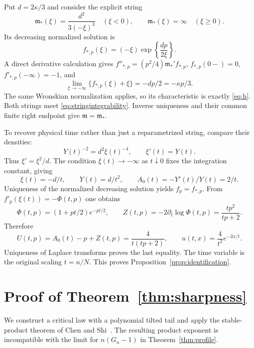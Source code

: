 \documentclass[11pt,letterpaper,reqno]{amsart}
\theoremstyle{plain}
\begin{document}
Put $d=2\kappa/3$ and consider the explicit string
\begin{equation}\label{eq:modelstring}
 \mathfrak m_*(\xi)=\frac{d^2}{3(-\xi)^3}\quad(\xi<0),\qquad
 \mathfrak m_*(\xi)=\infty\quad(\xi\ge0).
\end{equation}
Its decreasing normalized solution is
\[
 f_{*,p}(\xi)=(-\xi)\exp\left\{\frac{dp}{2\xi}\right\}.
\]
A direct derivative calculation gives $f''_{*,p}=(p^2/4)\mathfrak m_*'f_{*,p}$, $f_{*,p}(0-)=0$, $f'_{*,p}(-\infty)=-1$, and
\[
 \lim_{\xi\to-\infty}\{f_{*,p}(\xi)+\xi\}=-dp/2=-\kappa p/3.
\]
The same Wronskian normalization applies, so its characteristic is exactly \eqref{eq:h}. Both strings meet \eqref{eq:stringintegrability}. Inverse uniqueness and their common finite right endpoint give $\mathfrak m=\mathfrak m_*$.

To recover physical time rather than just a reparametrized string, compare their densities:
\[
 Y(t)^{-2}=d^2\xi(t)^{-4},\qquad \xi'(t)=Y(t).
\]
Thus $\xi'=\xi^2/d$. The condition $\xi(t)\to-\infty$ as $t\downarrow0$ fixes the integration constant, giving
\[
 \xi(t)=-d/t,\qquad Y(t)=d/t^2,\qquad A_0(t)=-Y'(t)/Y(t)=2/t.
\]
Uniqueness of the normalized decreasing solution yields $f_p=f_{*,p}$. From $f'_p(\xi(t))=-\Phi(t,p)$ one obtains
\[
 \Phi(t,p)=(1+pt/2)e^{-pt/2},\qquad
 Z(t,p)=-2\partial_t\log\Phi(t,p)=\frac{tp^2}{tp+2}.
\]
Therefore
\begin{equation}\label{eq:rigidprofile}
 U(t,p)=A_0(t)-p+Z(t,p)=\frac4{t(tp+2)},\qquad
 u(t,x)=\frac4{t^2}e^{-2x/t}.
\end{equation}
Uniqueness of Laplace transforms proves the last equality. The time variable is the original scaling $t=n/N$. This proves Proposition~\ref{prop:identification}.

\section{Proof of Theorem~\ref{thm:sharpness}}\label{sec:sharpness}
We construct a critical law with a polynomial tilted tail and apply the stable-product theorem of Chen and Shi~\cite[Theorem~1.1]{CS}. The resulting product exponent is incompatible with the limit for $n(G_n-1)$ in Theorem~\ref{thm:profile}.
\end{document}
